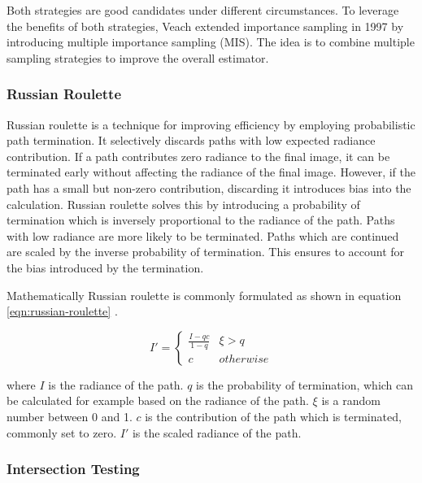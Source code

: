 Both strategies are good candidates under different circumstances. To leverage the benefits of both strategies, Veach extended importance sampling in 1997 \cite{veachMonteCarloLightTransport} by introducing multiple importance sampling (\gls{MIS}). The idea is to combine multiple sampling strategies to improve the overall estimator.

\subsubsection{Russian Roulette}
\label{ch:russianRoulette}

Russian roulette is a technique for improving efficiency by employing probabilistic path termination. It selectively discards paths with low expected radiance contribution. If a path contributes zero radiance to the final image, it can be terminated early without affecting the radiance of the final image. However, if the path has a small but non-zero contribution, discarding it introduces bias into the calculation. Russian roulette solves this by introducing a probability of termination which is inversely proportional to the radiance of the path. Paths with low radiance are more likely to be terminated. Paths which are continued are scaled by the inverse probability of termination. This ensures to account for the bias introduced by the termination.

Mathematically Russian roulette is commonly formulated as shown in equation \ref{eqn:russian-roulette} \cite{Pharr_Physically_Based_Rendering_2023}.

\begin{equation}
  \label{eqn:russian-roulette}
  I' = \begin{cases} \frac{I-qc}{1-q} & \xi > q \\ c & otherwise \end{cases}
\end{equation}
  
where $I$ is the radiance of the path. $q$ is the probability of termination, which can be calculated for example based on the radiance of the path. $\xi$ is a random number between 0 and 1. $c$ is the contribution of the path which is terminated, commonly set to zero. $I'$ is the scaled radiance of the path.


\subsubsection{Intersection Testing}

